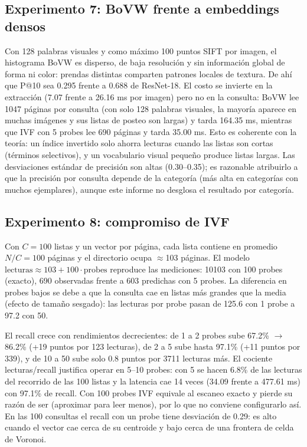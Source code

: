 \documentclass[11pt,a4paper]{article}
\begin{document}
\subsection{Experimento 7: BoVW frente a embeddings densos}
Con 128 palabras visuales y como máximo 100 puntos SIFT por imagen, el histograma BoVW es disperso, de baja resolución y sin información global de forma ni color: prendas distintas comparten patrones locales de textura. De ahí que P@10 sea 0.295 frente a 0.688 de ResNet-18. El costo se invierte en la extracción (7.07 frente a 26.16 ms por imagen) pero no en la consulta: BoVW lee 1047 páginas por consulta (con solo 128 palabras visuales, la mayoría aparece en muchas imágenes y sus listas de posteo son largas) y tarda 164.35 ms, mientras que IVF con 5 probes lee 690 páginas y tarda 35.00 ms. Esto es coherente con la teoría: un índice invertido solo ahorra lecturas cuando las listas son cortas (términos selectivos), y un vocabulario visual pequeño produce listas largas. Las desviaciones estándar de precisión son altas (0.30--0.35); es razonable atribuirlo a que la precisión por consulta depende de la categoría (más alta en categorías con muchos ejemplares), aunque este informe no desglosa el resultado por categoría.

\subsection{Experimento 8: compromiso de IVF}
Con $C=100$ listas y un vector por página, cada lista contiene en promedio $N/C=100$ páginas y el directorio ocupa $\approx$103 páginas. El modelo $\text{lecturas}\approx 103+100\cdot\text{probes}$ reproduce las mediciones: 10103 con 100 probes (exacto), 690 observadas frente a 603 predichas con 5 probes. La diferencia en probes bajos se debe a que la consulta cae en listas más grandes que la media (efecto de tamaño sesgado): las lecturas por probe pasan de 125.6 con 1 probe a 97.2 con 50.

El recall crece con rendimientos decrecientes: de 1 a 2 probes sube 67.2\% $\rightarrow$ 86.2\% (+19 puntos por 123 lecturas), de 2 a 5 sube hasta 97.1\% (+11 puntos por 339), y de 10 a 50 sube solo 0.8 puntos por 3711 lecturas más. El cociente lecturas/recall justifica operar en 5--10 probes: con 5 se hacen 6.8\% de las lecturas del recorrido de las 100 listas y la latencia cae 14 veces (34.09 frente a 477.61 ms) con 97.1\% de recall. Con 100 probes IVF equivale al escaneo exacto y pierde su razón de ser (aproximar para leer menos), por lo que no conviene configurarlo así. En las 100 consultas el recall con un probe tiene desviación de 0.29: es alto cuando el vector cae cerca de su centroide y bajo cerca de una frontera de celda de Voronoi.
\end{document}

